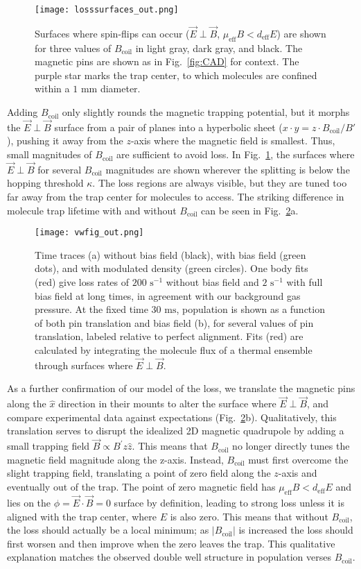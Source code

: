 \documentclass[%
 reprint,
 amsmath,amssymb,
 aps,
prl,
]{revtex4-1}
\newcommand{\bcl}{{$B_\text{coil}$}}
\newcommand{\epb}{{$\vec{E}\!\perp\!\vec{B}$}}
\begin{document}
\begin{figure}[tb]
\texttt{[image: losssurfaces\_out.png]}%
\caption{
Surfaces where spin-flips can occur (\epb{}, $\mu_\text{eff}B<d_\text{eff}E$) are shown for three values of \bcl{} in light gray, dark gray, and black. 
The magnetic pins are shown as in Fig.~\ref{fig:CAD} for context. 
The purple star marks the trap center, to which molecules are confined within a \raisebox{2.5px}{\texttildelow} $\!\!1\text{ mm}$ diameter.
}
\label{fig:LSurfs}
\end{figure}

Adding \bcl{} only slightly rounds the magnetic trapping potential, but it morphs the \epb{} surface from a pair of planes into a hyperbolic sheet ($x\cdot y= z\cdot B_\text{coil}/B'$), pushing it away from the $z$-axis where the magnetic field is smallest. 
Thus, small magnitudes of \bcl{} are sufficient to avoid loss. 
In Fig.~\ref{fig:LSurfs}, the surfaces where \epb{} for several \bcl{} magnitudes are shown wherever the splitting is below the hopping threshold $\kappa$. 
The loss regions are always visible, but they are tuned too far away from the trap center for molecules to access. 
The striking difference in molecule trap lifetime with and without \bcl{} can be seen in Fig.~\ref{fig:WVplot}a.

\begin{figure}[tb]
\texttt{[image: vwfig\_out.png]}%
\caption{
Time traces (a) without bias field (black), with bias field (green dots), and with modulated density (green circles). 
One body fits (red) give loss rates of $200\text{ s}^{-1}$ without bias field and $2\text{ s}^{-1}$ with full bias field at long times, in agreement with our background gas pressure. 
At the fixed time $30\text{ ms}$, population is shown as a function of both pin translation and bias field (b), for several values of pin translation, labeled relative to perfect alignment. 
Fits (red) are calculated by integrating the molecule flux of a thermal ensemble through surfaces where \epb.
\label{fig:WVplot}}
\end{figure}

As a further confirmation of our model of the loss, we translate the magnetic pins along the $\hat{x}$ direction in their mounts to alter the surface where \epb{}, and compare experimental data against expectations (Fig.~\ref{fig:WVplot}b). 
Qualitatively, this translation serves to disrupt the idealized 2D magnetic quadrupole by adding a small trapping field $\vec{B}\propto B^\prime z\hat{z}$. 
This means that \bcl{} no longer directly tunes the magnetic field magnitude along the z-axis. 
Instead, \bcl{} must first overcome the slight trapping field, translating a point of zero field along the $z$-axis and eventually out of the trap. The point of zero magnetic field has $\mu_\text{eff}B<d_\text{eff}E$ and lies on the $\phi=\vec{E}\cdot\vec{B}=0$ surface by definition, leading to strong loss unless it is aligned with the trap center, where $E$ is also zero. 
This means that without \bcl{}, the loss should actually be a local minimum; as $|B_\text{coil}|$ is increased the loss should first worsen and then improve when the zero leaves the trap. 
This qualitative explanation matches the observed double well structure in population verses \bcl.
\end{document}
